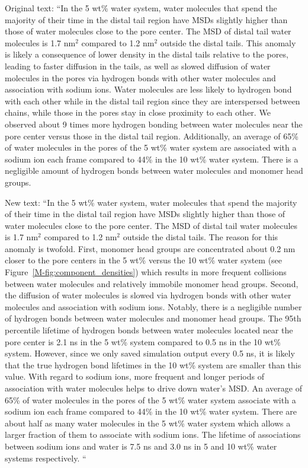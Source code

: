 \documentclass{article}
\begin{document}
\begin{enumerate}
    Original text: ``In the 5 wt\% water system, water molecules that spend the majority
    of their time in the distal tail region have MSDs slightly higher than those of water
    molecules close to the pore center. The MSD of distal tail water molecules is 1.7 nm$^2$
    compared to 1.2 nm$^2$ outside the distal tails. This anomaly is likely a consequence
    of lower density in the distal tails relative to the pores, leading to faster diffusion
    in the tails, as well as slowed diffusion of water molecules in the pores via hydrogen 
    bonds with other water molecules and association with sodium ions. Water molecules are 
    less likely to hydrogen bond with each other while in the distal tail region since they
    are interspersed between chains, while those in the pores stay in close proximity to 
    each other. We observed about 9 times more hydrogen bonding between water molecules 
    near the pore center versus those in the distal tail region. Additionally, an average 
    of 65\% of water molecules in the pores of the 5 wt\% water system are associated
    with a sodium ion each frame compared to 44\% in the 10 wt\% water system. There is a
    negligible amount of hydrogen bonds between water molecules and monomer head groups.
    
    New text: ``In the 5 wt\% water system, water molecules that spend the majority of their 
	time in the distal tail region have MSDs slightly higher than those of water molecules
	close to the pore center. The MSD of distal tail water molecules is 1.7 nm$^2$
	compared to 1.2 nm$^2$ outside the distal tails. The reason for this anomaly is twofold. 
	First, monomer head groups are concentrated about 0.2 nm closer to the pore centers
	in the 5 wt\% versus the 10 wt\% water system (see Figure~\ref{M-fig:component_densities})  %
	which results in more frequent collisions between water molecules and relatively immobile 
	monomer head groups. Second, the diffusion of water molecules is slowed via hydrogen
	bonds with other water molecules and association with sodium ions. Notably, there is a 
	negligible number of hydrogen bonds between water molecules and monomer head groups.
    The 95th percentile lifetime of hydrogen bonds between water molecules located near the
	pore center is 2.1 ns in the 5 wt\% system compared to 0.5 ns in the 10 wt\% system. 
	However, since we only saved simulation output every 0.5 ns, it is likely that the 
	true hydrogen bond lifetimes in the 10 wt\% system are smaller than this value. 
	With regard to sodium ions, more frequent and longer periods of association
	with water molecules helps to drive down water's MSD. An average of 65\% of water 
	molecules in the pores of the 5 wt\% water system associate with a sodium ion each
	frame compared to 44\% in the 10 wt\% water system. There are about half as many water
	molecules in the 5 wt\% water system which allows a larger fraction of them to associate
	with sodium ions. The lifetime of associations between sodium ions and water is 7.5 ns
	and 3.0 ns in 5 and 10 wt\% water systems respectively.  ``
	

\end{enumerate}
\end{document}

